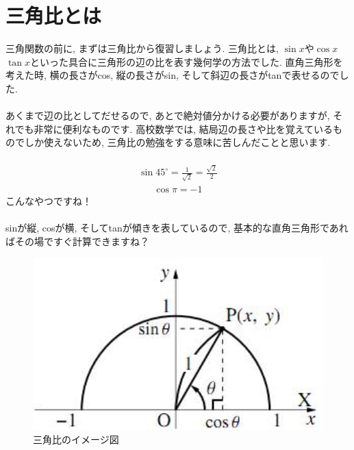 \documentclass[11pt,a4paper]{jreport}
\begin{document}
\section{三角比とは}
三角関数の前に, まずは三角比から復習しましょう. 三角比とは, $\sin x$や$\cos x$ $\tan x$といった具合に三角形の辺の比を表す幾何学の方法でした. 直角三角形を考えた時, 横の長さがcos, 縦の長さがsin, そして斜辺の長さがtanで表せるのでした. \\
\\
あくまで辺の比としてだせるので, あとで絶対値分かける必要がありますが, それでも非常に便利なものです. 高校数学では, 結局辺の長さや比を覚えているものでしか使えないため, 三角比の勉強をする意味に苦しんだことと思います.\\
\\
\begin{eqnarray}
\sin 45^\circ = \frac{1}{\sqrt{2}} = \frac{\sqrt{2}}2
\end{eqnarray}
\begin{eqnarray}
\cos \pi = -1
\end{eqnarray}
こんなやつですね！\\
\\
sinが縦, cosが横, そしてtanが傾きを表しているので, 基本的な直角三角形であればその場ですぐ計算できますね？\\

\begin{figure}[H]
\label{im:trigonometry}
  \centering
  \includegraphics[width=120mm,bb=0 0 287 170]{figures/trigonometry.png}
  \caption{三角比のイメージ図}
\end{figure}
\end{document}
